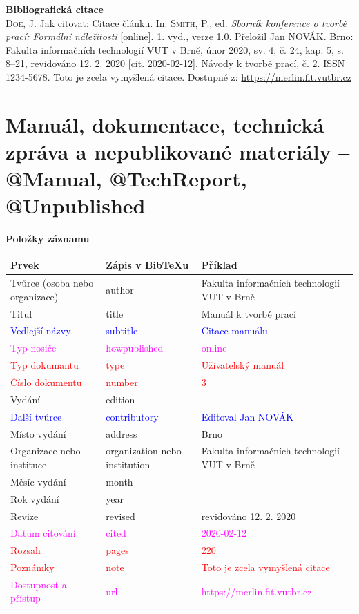 \bigskip

\noindent \textbf{Bibliografická citace}\\
\textsc{Doe}, J. Jak citovat: Citace článku.
In: \textsc{Smith}, P., ed. \textit{Sborník konference o tvorbě prací: Formální náležitosti} [online]. 1. vyd., verze 1.0. Přeložil Jan NOVÁK. Brno: Fakulta informačních technologií VUT v Brně, únor 2020, sv. 4, č. 24, kap. 5, s. 8–21, revidováno 12. 2. 2020 [cit. 2020-02-12]. Návody k tvorbě prací, č. 2. ISSN 1234-5678. Toto je zcela vymyšlená citace. Dostupné z: \url{https://merlin.fit.vutbr.cz}
\newpage
\section*{Manuál, dokumentace, technická zpráva a nepublikované materiály -- @Manual, @TechReport, @Unpublished}
\label{pr-manual}
\noindent \textbf{Položky záznamu}

\medskip

\begin{tabularx}{0.95\linewidth}{X X >{\raggedright\arraybackslash}X}
    Prvek & Zápis v BibTeXu & Příklad\\\hline
    Tvůrce (osoba nebo organizace) & author & Fakulta informačních technologií VUT v Brně\\
    Titul & title & Manuál k tvorbě prací\\
    \textcolor{blue}{Vedlejší názvy} & \textcolor{blue}{subtitle} & \textcolor{blue}{Citace manuálu}\\
    \textcolor{magenta}{Typ nosiče} & \textcolor{magenta}{howpublished} & \textcolor{magenta}{online}\\
    \textcolor{red}{Typ dokumantu} & \textcolor{red}{type} & \textcolor{red}{Uživatelský manuál}\\
    \textcolor{red}{Číslo dokumentu} & \textcolor{red}{number} & \textcolor{red}{3}\\
    Vydání & edition & 1\\
    \textcolor{blue}{Další tvůrce} & \textcolor{blue}{contributory} & \textcolor{blue}{Editoval Jan NOVÁK}\\
    Místo vydání & address & Brno\\
    Organizace nebo instituce & organization nebo institution & Fakulta informačních technologií VUT v Brně\\
    Měsíc vydání & month & 2\\
    Rok vydání & year & 2020\\
    Revize & revised & revidováno 12. 2. 2020\\
    \textcolor{magenta}{Datum citování} & \textcolor{magenta}{cited} & \textcolor{magenta}{2020-02-12}\\
    \textcolor{red}{Rozsah} & \textcolor{red}{pages} & \textcolor{red}{220}\\   
    \textcolor{red}{Poznámky} & \textcolor{red}{note} & \textcolor{red}{Toto je zcela vymyšlená citace}\\
    \textcolor{magenta}{Dostupnost a přístup} & \textcolor{magenta}{url} & \textcolor{magenta}{https://merlin.fit.vutbr.cz}\\
\end{tabularx}

